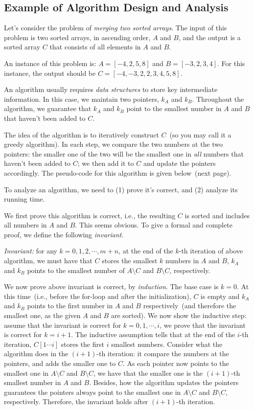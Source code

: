 \subsection*{Example of Algorithm Design and Analysis}

Let's consider the problem of \emph{merging two sorted arrays}. The input of this problem is two sorted arrays, in ascending order, $A$ and $B$,
and the output is a sorted array $C$ that consists of all elements in $A$ and $B$.

An instance of this problem is: $A = [-4, 2, 5, 8]$ and $B = [-3, 2, 3, 4]$. For this instance, the output should be $C = [-4, -3, 2, 2, 3, 4, 5, 8]$.

An algorithm usually requires \emph{data structures} to store key intermediate information.
In this case, we maintain two pointers, $k_A$ and $k_B$. Throughout the algorithm,
we guarantee that $k_A$ and $k_B$ point to the smallest number in $A$ and $B$ that haven't been added to $C$.

The idea of the algorithm is to iteratively construct $C$~(so you may call it a greedy algorithm).
In each step, we compare the two numbers at the two pointers: the smaller one of the two will be the smallest one
in \emph{all} numbers that haven't been added to $C$; we then add it to $C$ and update the pointers accordingly.
The pseudo-code for this algorithm is given below~(next page).


To analyze an algorithm, we need to (1) prove it's correct, and (2) analyze its running time.

We first prove this algorithm is correct, i.e., the resulting $C$ is sorted and includes all numbers in $A$ and $B$.
This seems obvious. To give a formal and complete proof, we define the following \emph{invariant}. 

\emph{Invariant:} for any $k = 0, 1, 2, \cdots, m + n$,
at the end of the $k$-th iteration of above algorithm, we must have that $C$ stores the smallest $k$ numbers in $A$ and $B$, $k_A$ and $k_B$
points to the smallest number of $A\setminus C$ and $B\setminus C$, respectively. 

We now prove above invariant is correct, by \emph{induction}. The base case is $k = 0$. At this time~(i.e., before the for-loop and after the initialization), $C$ is empty and $k_A$ and $k_B$ points
to the first number in $A$ and $B$ respectively~(and therefore the smallest one, as the given $A$ and $B$ are sorted). We now show the inductive step:
assume that the invariant is correct for $k = 0, 1, \cdots, i$, we prove that the invariant is correct for $k = i + 1$.
The inductive assumption tells that at the end of the $i$-th iteration, $C[1\cdots i]$ stores the first $i$ smallest numbers.
Consider what the algorithm does in the $(i+1)$-th iteration: it compare the numbers at the pointers, and adds the smaller one to $C$.
As each pointer now points to the smallest one in $A\setminus C$ and $B\setminus C$, we have that the smaller one is the $(i+1)$-th smallest number 
in $A$ and $B$. Besides, how the algorithm updates the pointers guarantees the pointers always point to the smallest one
in $A\setminus C$ and $B\setminus C$, respectively. Therefore, the invariant holds after $(i + 1)$-th iteration.

